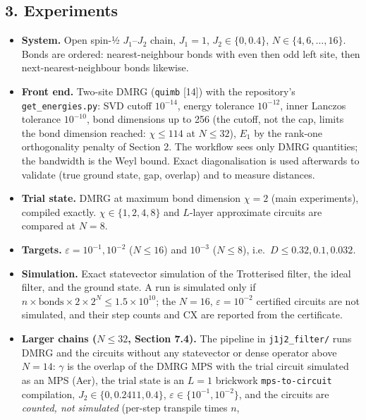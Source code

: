 \documentclass[
]{article}
\providecommand{\tightlist}{%
  \setlength{\itemsep}{0pt}\setlength{\parskip}{0pt}}
\begin{document}
\hypertarget{experiments}{%
\subsection{3. Experiments}\label{experiments}}

\begin{itemize}
\tightlist
\item
  \textbf{System.} Open spin-½ \(J_1\)--\(J_2\) chain, \(J_1=1\),
  \(J_2\in\{0,0.4\}\), \(N\in\{4,6,\dots,16\}\). Bonds are ordered:
  nearest-neighbour bonds with even then odd left site, then
  next-nearest-neighbour bonds likewise.
\item
  \textbf{Front end.} Two-site DMRG (\texttt{quimb} {[}14{]}) with the
  repository's \texttt{get\_energies.py}: SVD cutoff \(10^{-14}\),
  energy tolerance \(10^{-12}\), inner Lanczos tolerance \(10^{-10}\),
  bond dimensions up to 256 (the cutoff, not the cap, limits the bond
  dimension reached: \(\chi\le114\) at \(N\le32\)), \(E_1\) by the
  rank-one orthogonality penalty of Section 2. The workflow sees only
  DMRG quantities; the bandwidth is the Weyl bound. Exact
  diagonalisation is used afterwards to validate (true ground state,
  gap, overlap) and to measure distances.
\item
  \textbf{Trial state.} DMRG at maximum bond dimension \(\chi=2\) (main
  experiments), compiled exactly. \(\chi\in\{1,2,4,8\}\) and \(L\)-layer
  approximate circuits are compared at \(N=8\).
\item
  \textbf{Targets.} \(\varepsilon=10^{-1},10^{-2}\) (\(N\le16\)) and
  \(10^{-3}\) (\(N\le8\)), i.e.~\(D\le0.32,0.1,0.032\).
\item
  \textbf{Simulation.} Exact statevector simulation of the Trotterised
  filter, the ideal filter, and the ground state. A run is simulated
  only if \(n\times\text{bonds}\times2\times2^N\le1.5\times10^{10}\);
  the \(N=16\), \(\varepsilon=10^{-2}\) certified circuits are not
  simulated, and their step counts and CX are reported from the
  certificate.
\item
  \textbf{Larger chains (\(N\le32\), Section 7.4).} The pipeline in
  \texttt{j1j2\_filter/} runs DMRG and the circuits without any
  statevector or dense operator above \(N=14\): \(\gamma\) is the
  overlap of the DMRG MPS with the trial circuit simulated as an MPS
  (Aer), the trial state is an \(L=1\) brickwork \texttt{mps-to-circuit}
  compilation, \(J_2\in\{0,0.2411,0.4\}\),
  \(\varepsilon\in\{10^{-1},10^{-2}\}\), and the circuits are
  \emph{counted, not simulated} (per-step transpile times \(n\),

\end{itemize}
\end{document}
